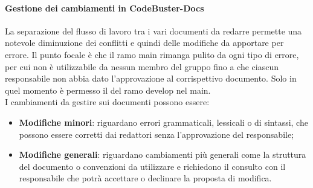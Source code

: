 \paragraph{Gestione dei cambiamenti in CodeBuster-Docs}
La separazione del flusso di lavoro tra i vari documenti da redarre permette una notevole diminuzione dei conflitti e quindi delle modifiche da apportare per errore. Il punto focale è che il ramo main rimanga pulito da ogni tipo di errore, per cui non è utilizzabile da nessun membro del gruppo fino a che ciascun responsabile non abbia dato l'approvazione al corrispettivo documento. Solo in quel momento è permesso il  del ramo develop nel main. \\
I cambiamenti da gestire sui documenti possono essere:
\begin{itemize}
	\item \textbf{Modifiche minori}: riguardano errori grammaticali, lessicali o di sintassi, che possono essere corretti dai redattori senza l'approvazione del responsabile;
	\item \textbf{Modifiche generali}: riguardano cambiamenti più generali come la struttura del documento o convenzioni da utilizzare e richiedono il consulto con il responsabile che potrà accettare o declinare la proposta di modifica.
\end{itemize}